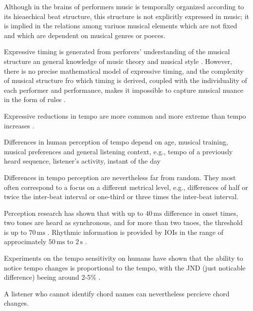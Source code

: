 \documentclass{scrartcl}
\begin{document}
Although in the brains of performers music is temporally organized according to its hieaechical beat structure, this structure is not explicitly expressed in music; it is implied in the relations among variuos musical elements which are not fixed and which are dependent on musical genres or poeces.

Expressive timing is generated from perforers' understanding of the musical structure an general knowledge of music theory and musical style \cite{Clarke1999}. However, there is no precise mathematical model of expressive timing, and the complexity of musical structure fro which timing is derived, coupled with the individuality of each performer and performance, makes it impossible to capture musical nuance in the form of rules \cite{Dixon2001}. 

Expressive reductions in tempo are more common and more extreme than tempo increases \cite{Repp1994}. %

Differences in human perception of tempo depend on age, musical training, musical preferences and general listening context, e.g., tempo of a previously heard sequence, listener's activity, instant of the day \cite{Drake1993,Drake2000,Drake2000b}

Differences in tempo perception are nevertheless far from random. They most often correspond to a focus on a different metrical level, e.g., differences of half or twice the inter-beat interval or one-third or three times the inter-beat interval. 

Perception research has shown that with up to $40\,\text{ms}$ difference in onset times, two tones are heard as synchronous, and for more than two tnoes, the threshold is up to $70\,\text{ms}$ \cite{Handel1989}. Rhythmic information is provided by IOIs in the range of approcimately $50\,\text{ms}$ to $2\,\text{s}$ \cite{Handel1989}.

Experiments on the tempo sensitivity on humans have shown that the ability to notice tempo changes is proportional to the tempo, with the JND (just noticable difference) beeing around 2-5\% \cite{Drake1993}.

A listener who cannot identify chord names can nevertheless percieve chord changes.

\end{document}
